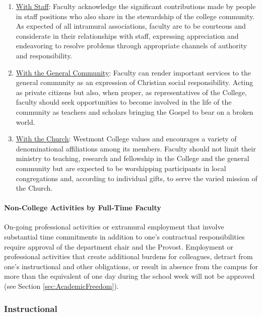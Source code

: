 \begin{enumerate}[label=\alph*)]
					\item{\underline{With Staff}:  Faculty acknowledge the significant contributions made by people in staff positions who also share in the stewardship of the college community.  As expected of all intramural associations, faculty are to be courteous and considerate in their relationships with staff, expressing appreciation and endeavoring to resolve problems through appropriate channels of authority and responsibility.}
					\item{\underline{With the General Community}:  Faculty can render important services to the general community as an expression of Christian social responsibility.  Acting as private citizens but also, when proper, as representatives of the College, faculty should seek opportunities to become involved in the life of the community as teachers and scholars bringing the Gospel to bear on a broken world.}
					\item{\underline{With the Church}:  Westmont College values and encourages a variety of denominational affiliations among its members.  Faculty should not limit their ministry to teaching, research and fellowship in the College and the general community but are expected to be worshipping participants in local congregations and, according to individual gifts, to serve the varied mission of the Church.}
				\end{enumerate}
			\paragraph{Non-College Activities by Full-Time Faculty}
				\label{sec:NonCollegeActivities}
				On-going professional activities or extramural employment that involve substantial time commitments in addition to one's contractual responsibilities require approval of the department chair and the Provost.  Employment or professional activities that create additional burdens for colleagues, detract from one's instructional and other obligations, or result in absence from the campus for more than the equivalent of one day during the school week will not be approved (see Section
				\ref{sec:AcademicFreedom}).
		\subsubsection{Instructional}
